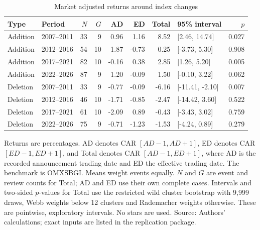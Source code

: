 \begin{table}[!htbp]
\centering
\caption{Market adjusted returns around index changes}\label{tab:returns}
\small
\setlength{\tabcolsep}{5pt}
\begin{tabular}{llrrrrrlr}
\toprule
Type & Period & $N$ & $G$ & AD & ED & Total & 95\% interval & $p$ \\
\midrule
Addition & 2007--2011 & 33 & 9 & 0.96 & 1.16 & 8.52 & [2.46, 14.74] & 0.027 \\
Addition & 2012--2016 & 54 & 10 & 1.87 & -0.73 & 0.25 & [-3.73, 5.30] & 0.908 \\
Addition & 2017--2021 & 82 & 10 & -0.16 & 0.38 & 2.85 & [1.26, 5.20] & 0.005 \\
Addition & 2022--2026 & 87 & 9 & 1.20 & -0.09 & 1.50 & [-0.10, 3.22] & 0.062 \\
Deletion & 2007--2011 & 33 & 9 & -0.77 & -0.09 & -6.16 & [-11.41, -2.10] & 0.007 \\
Deletion & 2012--2016 & 46 & 10 & -1.71 & -0.85 & -2.47 & [-14.42, 3.60] & 0.522 \\
Deletion & 2017--2021 & 61 & 10 & -2.09 & 0.89 & -0.43 & [-3.43, 3.02] & 0.759 \\
Deletion & 2022--2026 & 75 & 9 & -0.71 & -1.23 & -1.53 & [-4.24, 0.89] & 0.279 \\
\bottomrule
\end{tabular}
\begin{minipage}{\linewidth}\footnotesize\vspace{5pt}
Returns are percentages. AD denotes CAR $[AD-1,AD+1]$, ED denotes CAR $[ED-1,ED+1]$, and Total denotes CAR $[AD-1,ED+1]$, where AD is the recorded announcement trading date and ED the effective trading date. The benchmark is OMXSBGI. Means weight events equally. $N$ and $G$ are event and review counts for Total; AD and ED use their own complete cases. Intervals and two-sided $p$-values for Total use the restricted wild cluster bootstrap with 9,999 draws, Webb weights below 12 clusters and Rademacher weights otherwise. These are pointwise, exploratory intervals. No stars are used. Source: Authors' calculations; exact inputs are listed in the replication package.
\end{minipage}
\end{table}
